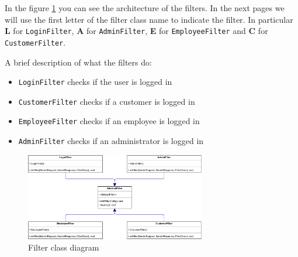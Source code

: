In the figure \ref{fig:FilterClassDiagram} you can see the architecture 
of the filters. In the next pages we will use
the first letter of the filter class name to indicate the filter.
In particular \textbf{L} for \texttt{LoginFilter}, 
\textbf{A} for \texttt{AdminFilter}, \textbf{E} for 
\texttt{EmployeeFilter} and \textbf{C} for \texttt{CustomerFilter}.

A brief description of what the filters do:
\begin{itemize}
    \item \texttt{LoginFilter} checks if the user is logged in
    \item \texttt{CustomerFilter} checks if a customer is logged in
    \item \texttt{EmployeeFilter} checks if an employee is logged in
    \item \texttt{AdminFilter} checks if an administrator is logged in
\end{itemize}
\FloatBarrier

\begin{figure}[H]
    \centering
    \includegraphics[width=0.7\textwidth]{Schemas/filter.drawio.pdf}
    \caption{Filter class diagram}
    \label{fig:FilterClassDiagram}
\end{figure}